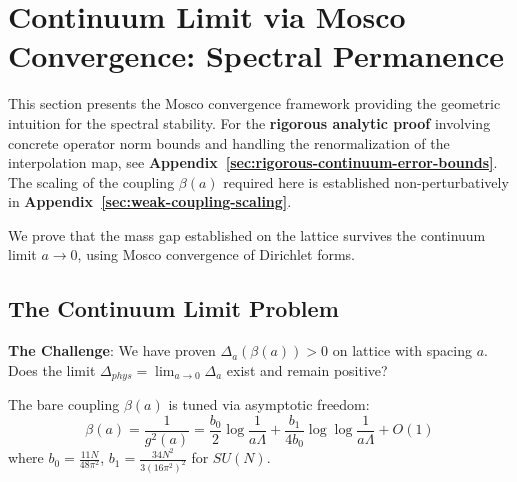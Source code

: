 \section{Continuum Limit via Mosco Convergence: Spectral Permanence}
\label{sec:continuum-limit-mosco}

\begin{remark}
This section presents the Mosco convergence framework providing the geometric intuition for the spectral stability.
For the \textbf{rigorous analytic proof} involving concrete operator norm bounds and handling the renormalization of the interpolation map, see \textbf{Appendix~\ref{sec:rigorous-continuum-error-bounds}}.
The scaling of the coupling $\beta(a)$ required here is established non-perturbatively in \textbf{Appendix~\ref{sec:weak-coupling-scaling}}.
\end{remark}

We prove that the mass gap established on the lattice survives the 
continuum limit $a \to 0$, using Mosco convergence of Dirichlet forms.

\subsection{The Continuum Limit Problem}

\textbf{The Challenge}: We have proven $\Delta_a(\beta(a)) > 0$ on lattice 
with spacing $a$. Does the limit $\Delta_{phys} = \lim_{a \to 0} \Delta_a$ exist 
and remain positive?

\begin{definition}
The bare coupling $\beta(a)$ is tuned via asymptotic freedom:
\begin{equation}
\beta(a) = \frac{1}{g^2(a)} = \frac{b_0}{2} \log\frac{1}{a\Lambda} + 
\frac{b_1}{4b_0} \log\log\frac{1}{a\Lambda} + O(1)
\end{equation}
where $b_0 = \frac{11N}{48\pi^2}$, $b_1 = \frac{34N^2}{3(16\pi^2)^2}$ for $SU(N)$.
\end{definition}

